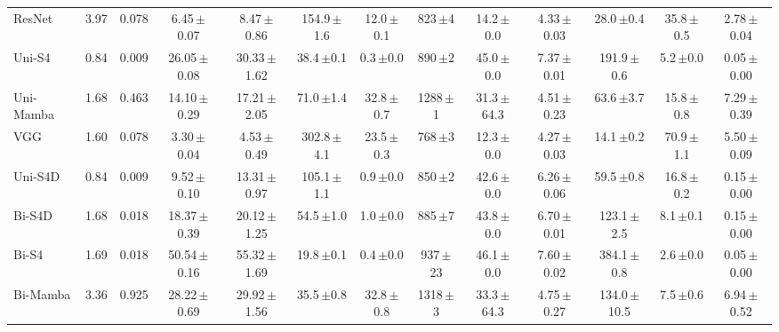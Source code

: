 \documentclass[sigconf,nonacm]{acmart}
\begin{document}
\begin{table}[t]
{\begin{tabular}{lcccccccccccc}
    ResNet & 3.97 & 0.078
      & 6.45{\scriptsize\,$\pm$0.07} & 8.47{\scriptsize\,$\pm$0.86} & 154.9{\scriptsize\,$\pm$1.6} & 12.0{\scriptsize\,$\pm$0.1}
      & 823{\scriptsize\,$\pm$4} & 14.2{\scriptsize\,$\pm$0.0} & 4.33{\scriptsize\,$\pm$0.03}
      & 28.0{\scriptsize\,$\pm$0.4} & 35.8{\scriptsize\,$\pm$0.5} & 2.78{\scriptsize\,$\pm$0.04} \\
    Uni-S4 & 0.84 & 0.009
      & 26.05{\scriptsize\,$\pm$0.08} & 30.33{\scriptsize\,$\pm$1.62} & 38.4{\scriptsize\,$\pm$0.1} & 0.3{\scriptsize\,$\pm$0.0}
      & 890{\scriptsize\,$\pm$2} & 45.0{\scriptsize\,$\pm$0.0} & 7.37{\scriptsize\,$\pm$0.01}
      & 191.9{\scriptsize\,$\pm$0.6} & 5.2{\scriptsize\,$\pm$0.0} & 0.05{\scriptsize\,$\pm$0.00} \\
    Uni-Mamba & 1.68 & 0.463
      & 14.10{\scriptsize\,$\pm$0.29} & 17.21{\scriptsize\,$\pm$2.05} & 71.0{\scriptsize\,$\pm$1.4} & 32.8{\scriptsize\,$\pm$0.7}
      & 1288{\scriptsize\,$\pm$1} & 31.3{\scriptsize\,$\pm$64.3} & 4.51{\scriptsize\,$\pm$0.23}
      & 63.6{\scriptsize\,$\pm$3.7} & 15.8{\scriptsize\,$\pm$0.8} & 7.29{\scriptsize\,$\pm$0.39} \\
    VGG & 1.60 & 0.078
      & 3.30{\scriptsize\,$\pm$0.04} & 4.53{\scriptsize\,$\pm$0.49} & 302.8{\scriptsize\,$\pm$4.1} & 23.5{\scriptsize\,$\pm$0.3}
      & 768{\scriptsize\,$\pm$3} & 12.3{\scriptsize\,$\pm$0.0} & 4.27{\scriptsize\,$\pm$0.03}
      & 14.1{\scriptsize\,$\pm$0.2} & 70.9{\scriptsize\,$\pm$1.1} & 5.50{\scriptsize\,$\pm$0.09} \\
    Uni-S4D & 0.84 & 0.009
      & 9.52{\scriptsize\,$\pm$0.10} & 13.31{\scriptsize\,$\pm$0.97} & 105.1{\scriptsize\,$\pm$1.1} & 0.9{\scriptsize\,$\pm$0.0}
      & 850{\scriptsize\,$\pm$2} & 42.6{\scriptsize\,$\pm$0.0} & 6.26{\scriptsize\,$\pm$0.06}
      & 59.5{\scriptsize\,$\pm$0.8} & 16.8{\scriptsize\,$\pm$0.2} & 0.15{\scriptsize\,$\pm$0.00} \\
    Bi-S4D & 1.68 & 0.018
      & 18.37{\scriptsize\,$\pm$0.39} & 20.12{\scriptsize\,$\pm$1.25} & 54.5{\scriptsize\,$\pm$1.0} & 1.0{\scriptsize\,$\pm$0.0}
      & 885{\scriptsize\,$\pm$7} & 43.8{\scriptsize\,$\pm$0.0} & 6.70{\scriptsize\,$\pm$0.01}
      & 123.1{\scriptsize\,$\pm$2.5} & 8.1{\scriptsize\,$\pm$0.1} & 0.15{\scriptsize\,$\pm$0.00} \\
    Bi-S4 & 1.69 & 0.018
      & 50.54{\scriptsize\,$\pm$0.16} & 55.32{\scriptsize\,$\pm$1.69} & 19.8{\scriptsize\,$\pm$0.1} & 0.4{\scriptsize\,$\pm$0.0}
      & 937{\scriptsize\,$\pm$23} & 46.1{\scriptsize\,$\pm$0.0} & 7.60{\scriptsize\,$\pm$0.02}
      & 384.1{\scriptsize\,$\pm$0.8} & 2.6{\scriptsize\,$\pm$0.0} & 0.05{\scriptsize\,$\pm$0.00} \\
    Bi-Mamba & 3.36 & 0.925
      & 28.22{\scriptsize\,$\pm$0.69} & 29.92{\scriptsize\,$\pm$1.56} & 35.5{\scriptsize\,$\pm$0.8} & 32.8{\scriptsize\,$\pm$0.8}
      & 1318{\scriptsize\,$\pm$3} & 33.3{\scriptsize\,$\pm$64.3} & 4.75{\scriptsize\,$\pm$0.27}
      & 134.0{\scriptsize\,$\pm$10.5} & 7.5{\scriptsize\,$\pm$0.6} & 6.94{\scriptsize\,$\pm$0.52} \\
    \bottomrule
  \end{tabular}%
  }
\end{table}
\end{document}
